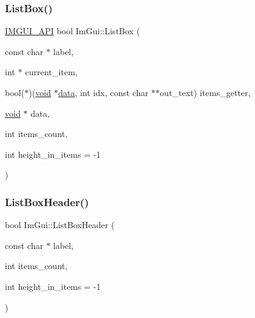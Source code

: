 \mbox{\label{namespaceImGui_ab5865b671bfa22738fac9ffd214470e2}} 
\subsubsection{\texorpdfstring{List\+Box()}{ListBox()}\hspace{0.1cm}{\footnotesize\ttfamily [2/2]}}
{\footnotesize\ttfamily \hyperlink{imgui_8h_a43829975e84e45d1149597467a14bbf5}{I\+M\+G\+U\+I\+\_\+\+A\+PI} bool Im\+Gui\+::\+List\+Box (\begin{DoxyParamCaption}\item[{const char $\ast$}]{label,  }\item[{int $\ast$}]{current\+\_\+item,  }\item[{bool($\ast$)(\hyperlink{imgui__impl__opengl3__loader_8h_ac668e7cffd9e2e9cfee428b9b2f34fa7}{void} $\ast$\hyperlink{imgui__impl__opengl3__loader_8h_abd87654504355b4c1bb002dcb1d4d16a}{data}, int idx, const char $\ast$$\ast$out\+\_\+text)}]{items\+\_\+getter,  }\item[{\hyperlink{imgui__impl__opengl3__loader_8h_ac668e7cffd9e2e9cfee428b9b2f34fa7}{void} $\ast$}]{data,  }\item[{int}]{items\+\_\+count,  }\item[{int}]{height\+\_\+in\+\_\+items = {\ttfamily -\/1} }\end{DoxyParamCaption})}

\mbox{\label{namespaceImGui_a6c5c48e5e5b90365f3f6faaa3307af26}} 
\subsubsection{\texorpdfstring{List\+Box\+Header()}{ListBoxHeader()}}
{\footnotesize\ttfamily bool Im\+Gui\+::\+List\+Box\+Header (\begin{DoxyParamCaption}\item[{const char $\ast$}]{label,  }\item[{int}]{items\+\_\+count,  }\item[{int}]{height\+\_\+in\+\_\+items = {\ttfamily -\/1} }\end{DoxyParamCaption})}

\mbox{\label{namespaceImGui_a4bf22fb84ba768fc18383af50e8c217f}} 
